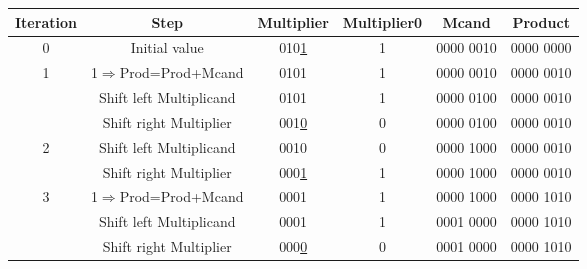 \documentclass[12pt, a4paper]{article}
\begin{document}
\begin{ans}
    \begin{center}
        \begin{tabular}{|c|c|c|c|c|c|}
            \hline
            Iteration & Step & Multiplier & Multiplier0 & Mcand & Product\\
            \hline
            0 & Initial value & 010\underline{1} & 1 & 0000 0010 & 0000 0000\\
            \hline
            \multirow{3}{*}{1} & \multicolumn{1}{|c}{1$\Rightarrow$Prod=Prod+Mcand} & \multicolumn{1}{|c}{0101} & \multicolumn{1}{|c}{1} & \multicolumn{1}{|c}{0000 0010} & \multicolumn{1}{|c|}{0000 0010} \\\cline{2-6}
                                & \multicolumn{1}{|c}{Shift left Multiplicand} & \multicolumn{1}{|c}{0101} & \multicolumn{1}{|c}{1} & \multicolumn{1}{|c}{0000 0100} & \multicolumn{1}{|c|}{0000 0010} \\\cline{2-6}
                                & \multicolumn{1}{|c}{Shift right Multiplier} & \multicolumn{1}{|c}{001\underline{0}} & \multicolumn{1}{|c}{0} & \multicolumn{1}{|c}{0000 0100} & \multicolumn{1}{|c|}{0000 0010} \\\hline

            \multirow{2}{*}{2} 
                                & \multicolumn{1}{|c}{Shift left Multiplicand} & \multicolumn{1}{|c}{0010} & \multicolumn{1}{|c}{0} & \multicolumn{1}{|c}{0000 1000} & \multicolumn{1}{|c|}{0000 0010} \\\cline{2-6}
                                & \multicolumn{1}{|c}{Shift right Multiplier} & \multicolumn{1}{|c}{000\underline{1}} & \multicolumn{1}{|c}{1} & \multicolumn{1}{|c}{0000 1000} & \multicolumn{1}{|c|}{0000 0010} \\\hline

            \multirow{3}{*}{3} & \multicolumn{1}{|c}{1$\Rightarrow$Prod=Prod+Mcand} & \multicolumn{1}{|c}{0001} & \multicolumn{1}{|c}{1} & \multicolumn{1}{|c}{0000 1000} & \multicolumn{1}{|c|}{0000 1010} \\\cline{2-6}
                                & \multicolumn{1}{|c}{Shift left Multiplicand} & \multicolumn{1}{|c}{0001} & \multicolumn{1}{|c}{1} & \multicolumn{1}{|c}{0001 0000} & \multicolumn{1}{|c|}{0000 1010} \\\cline{2-6}
                                & \multicolumn{1}{|c}{Shift right Multiplier} & \multicolumn{1}{|c}{000\underline{0}} & \multicolumn{1}{|c}{0} & \multicolumn{1}{|c}{0001 0000} & \multicolumn{1}{|c|}{0000 1010} \\\hline


\end{tabular}
\end{center}
\end{ans}
\end{document}
